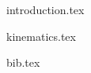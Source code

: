 \documentclass{article}
\begin{document}
{introduction.tex}

{kinematics.tex}








\newpage
{bib.tex}
\end{document}

